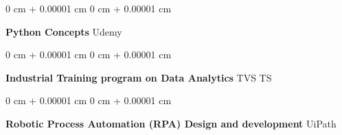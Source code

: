 \documentclass[10pt, letterpaper]{article}
\newenvironment{onecolentry}{
    \begin{adjustwidth}{
        0 cm + 0.00001 cm
    }{
        0 cm + 0.00001 cm
    }
}{
    \end{adjustwidth}
} %
\begin{document}
         \vspace{0.2 cm}

       \begin{onecolentry}
           \fontsize{12pt}{12pt} \textbf{Python Concepts}\AND%
  \fontsize{11pt}{11pt}\selectfont Udemy   %
        \end{onecolentry}
        \vspace{0.2 cm}

        \begin{onecolentry}
           \fontsize{12pt}{12pt} \textbf{Industrial Training program on Data Analytics}\AND%
  \fontsize{11pt}{11pt}\selectfont TVS TS  %
        \end{onecolentry}
        
        \vspace{0.2 cm}

         \begin{onecolentry}
           \fontsize{12pt}{12pt} \textbf{Robotic Process Automation (RPA) Design and development}\AND%
  \fontsize{11pt}{11pt}\selectfont UiPath  %
        \end{onecolentry}

        


    
   



    
   


    
    

    
\end{document}
